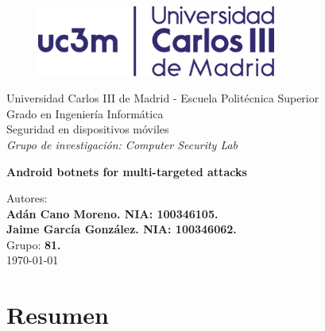 \documentclass[a4paper,11pt]{report}
\begin{document}
\begin{titlepage}

\begin{center}
\vspace*{0.5in}
\begin{figure}[htb]
\begin{center}
\includegraphics[width=0.7\textwidth]{uc3m}
\end{center}
\end{figure}
\vspace*{1in}
Universidad Carlos III de Madrid - Escuela Politécnica Superior \\
Grado en Ingeniería Informática \\
Seguridad en dispositivos móviles \\

\vspace*{0.1in}
\emph{Grupo de investigación: Computer Security Lab}  \\

\vspace*{1.2in}
\begin{huge}
\textbf{Android botnets for multi-targeted attacks} \\
\end{huge}


\end{center}

\vfill
\begin{center}
Autores:\\
\textbf{Adán Cano Moreno. NIA: 100346105.}\\
\textbf{Jaime García González. NIA: 100346062.}\\
\vspace*{0.2in}
Grupo: \textbf{81.}\\
\vspace*{1in}
\today
\end{center}


\end{titlepage}


\tableofcontents
\thispagestyle{empty}
\chapter{Resumen}
\renewcommand{\thepage}{\arabic{page}}
\setcounter{page}{1}
\pagestyle{fancy}
\end{document}
